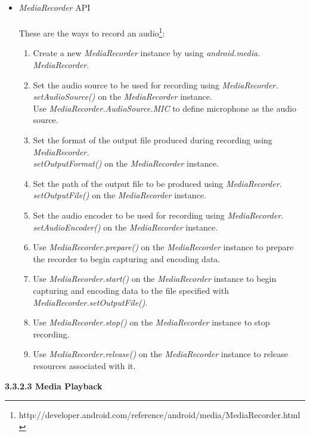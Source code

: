\begin{itemize}
\item \textit{MediaRecorder} API
\\\\These are the ways to record an audio\footnote[3]{http://developer.android.com/reference/android/media/MediaRecorder.html}:
\begin{enumerate}
\item Create a new \textit{MediaRecorder} instance by using \textit{android.media.}\\\textit{MediaRecorder}.
\item Set the audio source to be used for recording using \textit{MediaRecorder.}\\\textit{setAudioSource()} on the \textit{MediaRecorder} instance.
\\Use \textit{MediaRecorder.AudioSource.MIC} to define microphone as the audio source.
\item Set the format of the output file produced during recording using \textit{MediaRecorder.}\\\textit{setOutputFormat()} on the \textit{MediaRecorder} instance.
\item Set the path of the output file to be produced using \textit{MediaRecorder.}\\\textit{setOutputFile()} on the \textit{MediaRecorder} instance.
\item Set the audio encoder to be used for recording using \textit{MediaRecorder.}\\\textit{setAudioEncoder()} on the \textit{MediaRecorder} instance.
\item Use \textit{MediaRecorder.prepare()} on the \textit{MediaRecorder} instance to prepare the recorder to begin capturing and encoding data.
\item Use \textit{MediaRecorder.start()} on the \textit{MediaRecorder} instance to begin capturing and encoding data to the file specified with \textit{MediaRecorder.setOutputFile()}.
\item Use \textit{MediaRecorder.stop()} on the \textit{MediaRecorder} instance to stop recording.
\item Use \textit{MediaRecorder.release()} on the \textit{MediaRecorder} instance to release resources associated with it.
\end{enumerate}
\end{itemize}

\begin{flushleft}
\textbf{3.3.2.3 Media Playback}
\end{flushleft}

